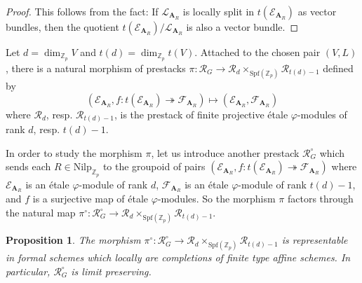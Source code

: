 \documentclass[10pt]{article}
\newtheorem{prop}[thm]{Proposition}
\numberwithin{equation}{section}
\newcommand{\bZ}{{\mathbb Z}}
\newcommand{\calE}{{\mathcal E}}
\newcommand{\calF}{{\mathcal F}}
\newcommand{\calL}{{\mathcal L}}
\newcommand{\calR}{{\mathcal R}}
\newcommand{\Spf}{{\mathrm{Spf}}}           %
\newcommand{\Nilp}{\mathrm{Nilp}}
\newcommand{\bfA}{{\textbf{A}}}
\begin{document}
\begin{proof}
    This follows from the fact: If $\calL_{\bfA_R}$ is locally split in $t(\calE_{\bfA_R})$ as vector bundles, then the quotient $t(\calE_{\bfA_R})/\calL_{\bfA_R}$ is also a vector bundle.
\end{proof}




 Let $d=\dim_{\bZ_p}V$ and $t(d)=\dim_{\bZ_p}t(V)$. Attached to the chosen pair $(V,L)$, there is a natural morphism of prestacks $\pi:\calR_G\to \calR_{d}\times_{\Spf(\bZ_p)}\calR_{t(d)-1}$ defined by 
 \[
(\calE_{\bfA_R},f:t(\calE_{\bfA_R})\twoheadrightarrow \calF_{\bfA_R})\mapsto (\calE_{\bfA_R},\calF_{\bfA_R})
 \]
 where $\calR_d$, resp. $\calR_{t(d)-1}$, is the prestack of finite projective \'etale $\varphi$-modules of rank $d$, resp. $t(d)-1$.

 In order to study the morphism $\pi$, let us introduce another prestack $\calR^{\circ}_G$ which sends each $R\in \Nilp_{\bZ_p}$ to the groupoid of pairs $(\calE_{\bfA_R},f:t(\calE_{\bfA_R})\twoheadrightarrow \calF_{\bfA_R})$ where $\calE_{\bfA_R}$ is an \'etale $\varphi$-module of rank $d$, $\calF_{\bfA_R}$ is an \'etale $\varphi$-module of rank $t(d)-1$, and $f$ is a surjective map of \'etale $\varphi$-modules. So the morphism $\pi$ factors through the natural map $\pi^{\circ}:\calR^{\circ}_G\to \calR_{d}\times_{\Spf(\bZ_p)}\calR_{t(d)-1}$.


\begin{prop}\label{surj1}
 The morphism $\pi^{\circ}:\calR^{\circ}_G\to \calR_{d}\times_{\Spf(\bZ_p)}\calR_{t(d)-1}$ is representable in formal schemes which locally are completions of finite type affine schemes. In particular, $\calR^{\circ}_G$ is limit preserving.
\end{prop}
\end{document}
